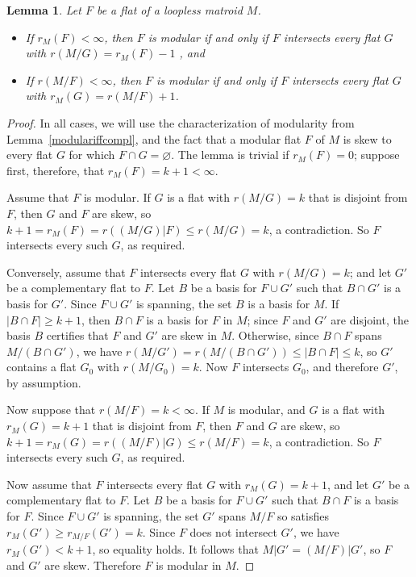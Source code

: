 \documentclass{amsart}
\theoremstyle{plain}
\newtheorem{lemma}[theorem]{Lemma}
\theoremstyle{definition}
\newcommand{\con}{/}
\newcommand{\es}{\varnothing}
\renewcommand{\le}{\leqslant}
\renewcommand{\ge}{\geqslant}
\begin{document}
\begin{lemma}\label{modularfinite}
  Let $F$ be a flat of a loopless matroid $M$.
  \begin{itemize} 
    \item If $r_M(F) < \infty$, then $F$ is modular if and only if $F$ intersects every flat $G$ with $r(M \con G) = r_M(F) - 1$ , and
    \item If $r(M \con F) < \infty$, then $F$ is modular if and only if $F$ intersects every flat $G$ with 
    $r_M(G) = r(M \con F) + 1$.
  \end{itemize}
\end{lemma}
\begin{proof}
  In all cases, we will use the characterization of modularity from Lemma~\ref{modulariffcompl}, 
  and the fact that a modular flat $F$ of $M$ is skew to every flat $G$ for which $F \cap G = \es$. 
  The lemma is trivial if $r_M(F) = 0$; suppose first, therefore, that $r_M(F) = k +1 < \infty$. 
  
  Assume that $F$ is modular. 
  If $G$ is a flat with $r(M \con G) = k$ that is disjoint from $F$, 
  then $G$ and $F$ are skew, so $k + 1 = r_M(F) = r((M \con G) | F) \le r(M \con G) = k$, a contradiction. 
  So $F$ intersects every such $G$, as required. 
  
  Conversely, assume that $F$ intersects every flat $G$ with $r(M \con G) = k$; and let $G'$ be a complementary flat to $F$. 
  Let $B$ be a basis for $F \cup G'$ such that $B \cap G'$ is a basis for $G'$. Since $F \cup G'$ is spanning, 
  the set $B$ is a basis for $M$. If $|B \cap F| \ge k+1$, then $B \cap F$ is a basis for $F$ in $M$;
  since $F$ and $G'$ are disjoint, the basis $B$ certifies that $F$ and $G'$ are skew in $M$. 
  Otherwise, since $B \cap F$ spans $M \con (B \cap G')$, we have $r(M \con G') = r(M \con (B \cap G')) \le |B \cap F| \le k$, 
  so $G'$ contains a flat $G_0$ with $r(M \con G_0) = k$. 
  Now $F$ intersects $G_0$, and therefore $G'$, by assumption. 

  Now suppose that $r(M \con F) = k < \infty$. 
  If $M$ is modular, and $G$ is a flat with $r_M(G) = k+1$ that is disjoint from $F$,
  then $F$ and $G$ are skew, so $k + 1 = r_M(G) = r((M \con F) | G) \le r(M \con F) = k$, a contradiction. 
  So $F$ intersects every such $G$, as required. 

  Now assume that $F$ intersects every flat $G$ with $r_M(G) = k+1$, and let $G'$ be a complementary flat to $F$. 
  Let $B$ be a basis for $F \cup G'$ such that $B \cap F$ is a basis for $F$. 
  Since $F \cup G'$ is spanning, the set $G'$ spans $M \con F$ so satisfies $r_M(G') \ge r_{M \con F}(G') = k$. 
  Since $F$ does not intersect $G'$, we have $r_M(G') < k+1$, so equality holds. 
  It follows that $M|G' = (M \con F)|G'$, so $F$ and $G'$ are skew. Therefore $F$ is modular in $M$. 
\end{proof}
\end{document}
